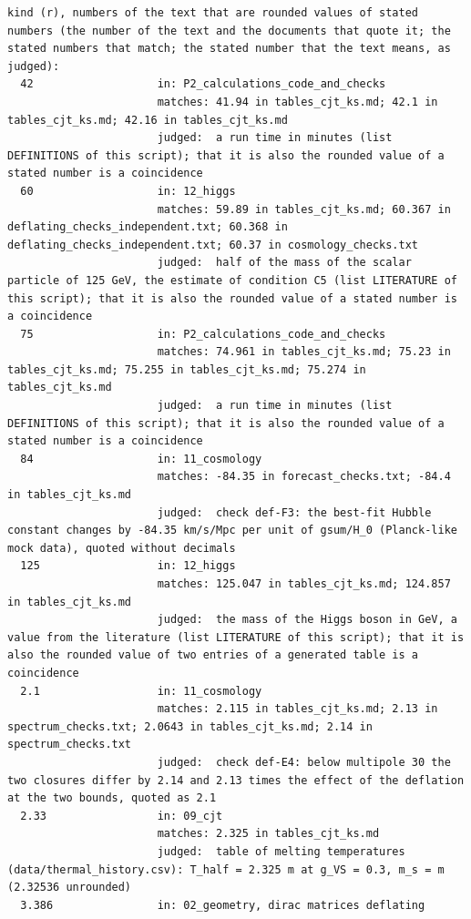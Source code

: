\documentclass[
  10pt,
]{article}
\begin{document}
\begin{verbatim}
kind (r), numbers of the text that are rounded values of stated numbers (the number of the text and the documents that quote it; the stated numbers that match; the stated number that the text means, as judged):
  42                   in: P2_calculations_code_and_checks
                       matches: 41.94 in tables_cjt_ks.md; 42.1 in tables_cjt_ks.md; 42.16 in tables_cjt_ks.md
                       judged:  a run time in minutes (list DEFINITIONS of this script); that it is also the rounded value of a stated number is a coincidence
  60                   in: 12_higgs
                       matches: 59.89 in tables_cjt_ks.md; 60.367 in deflating_checks_independent.txt; 60.368 in deflating_checks_independent.txt; 60.37 in cosmology_checks.txt
                       judged:  half of the mass of the scalar particle of 125 GeV, the estimate of condition C5 (list LITERATURE of this script); that it is also the rounded value of a stated number is a coincidence
  75                   in: P2_calculations_code_and_checks
                       matches: 74.961 in tables_cjt_ks.md; 75.23 in tables_cjt_ks.md; 75.255 in tables_cjt_ks.md; 75.274 in tables_cjt_ks.md
                       judged:  a run time in minutes (list DEFINITIONS of this script); that it is also the rounded value of a stated number is a coincidence
  84                   in: 11_cosmology
                       matches: -84.35 in forecast_checks.txt; -84.4 in tables_cjt_ks.md
                       judged:  check def-F3: the best-fit Hubble constant changes by -84.35 km/s/Mpc per unit of gsum/H_0 (Planck-like mock data), quoted without decimals
  125                  in: 12_higgs
                       matches: 125.047 in tables_cjt_ks.md; 124.857 in tables_cjt_ks.md
                       judged:  the mass of the Higgs boson in GeV, a value from the literature (list LITERATURE of this script); that it is also the rounded value of two entries of a generated table is a coincidence
  2.1                  in: 11_cosmology
                       matches: 2.115 in tables_cjt_ks.md; 2.13 in spectrum_checks.txt; 2.0643 in tables_cjt_ks.md; 2.14 in spectrum_checks.txt
                       judged:  check def-E4: below multipole 30 the two closures differ by 2.14 and 2.13 times the effect of the deflation at the two bounds, quoted as 2.1
  2.33                 in: 09_cjt
                       matches: 2.325 in tables_cjt_ks.md
                       judged:  table of melting temperatures (data/thermal_history.csv): T_half = 2.325 m at g_VS = 0.3, m_s = m (2.32536 unrounded)
  3.386                in: 02_geometry, dirac matrices deflating

\end{verbatim}
\end{document}
